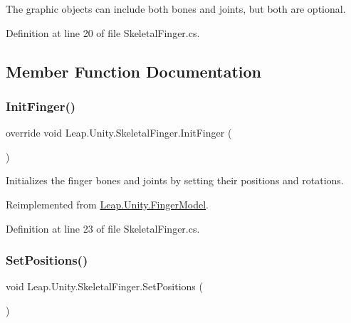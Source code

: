 The graphic objects can include both bones and joints, but both are optional. 

Definition at line 20 of file Skeletal\+Finger.\+cs.



\subsection{Member Function Documentation}
\mbox{\label{class_leap_1_1_unity_1_1_skeletal_finger_a1d595125b2ac26548297c23e4937ca03}} 
\subsubsection{\texorpdfstring{InitFinger()}{InitFinger()}}
{\footnotesize\ttfamily override void Leap.\+Unity.\+Skeletal\+Finger.\+Init\+Finger (\begin{DoxyParamCaption}{ }\end{DoxyParamCaption})\hspace{0.3cm}{\ttfamily [virtual]}}

Initializes the finger bones and joints by setting their positions and rotations. 

Reimplemented from \mbox{\hyperlink{class_leap_1_1_unity_1_1_finger_model_a27b24f96e9e709625779cc24bd5d72f3}{Leap.\+Unity.\+Finger\+Model}}.



Definition at line 23 of file Skeletal\+Finger.\+cs.

\mbox{\label{class_leap_1_1_unity_1_1_skeletal_finger_a41c13da1e39f9c79c45bfe6c4cfeeca1}} 
\subsubsection{\texorpdfstring{SetPositions()}{SetPositions()}}
{\footnotesize\ttfamily void Leap.\+Unity.\+Skeletal\+Finger.\+Set\+Positions (\begin{DoxyParamCaption}{ }\end{DoxyParamCaption})\hspace{0.3cm}{\ttfamily [protected]}}



